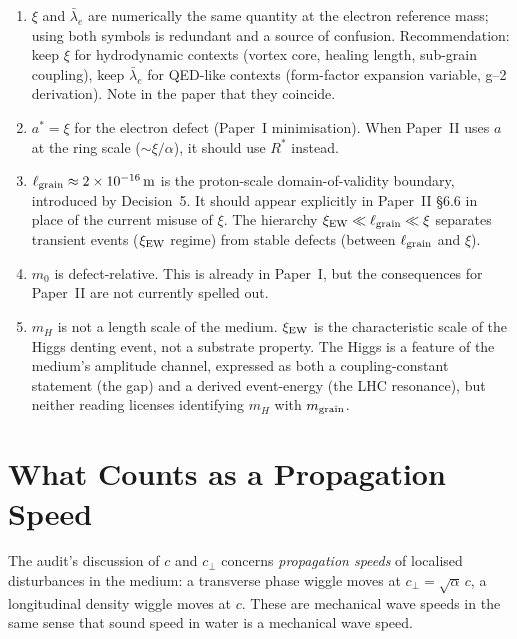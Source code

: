 \documentclass[11pt,a4paper]{article}
\begin{document}
\begin{enumerate}
\item $\xi$ and $\bar\lambda_e$ are numerically the same quantity at the
      electron reference mass; using both symbols is redundant and a source
      of confusion.  Recommendation: keep $\xi$ for hydrodynamic contexts
      (vortex core, healing length, sub-grain coupling), keep
      $\bar\lambda_e$ for QED-like contexts (form-factor expansion variable,
      g--2 derivation).  Note in the paper that they coincide.
\item $a^* = \xi$ for the electron defect (Paper~I minimisation).  When
      Paper~II uses $a$ at the ring scale ($\sim \xi/\alpha$), it should
      use $R^*$ instead.
\item $\ell_{\rm grain} \approx 2\times 10^{-16}\,\mathrm{m}$ is the
      proton-scale domain-of-validity boundary, introduced by Decision~5.
      It should appear explicitly in Paper~II \S6.6 in place of the
      current misuse of $\xi$.  The hierarchy
      $\xi_{\rm EW} \ll \ell_{\rm grain} \ll \xi$ separates transient
      events ($\xi_{\rm EW}$ regime) from stable defects (between
      $\ell_{\rm grain}$ and $\xi$).
\item $m_0$ is defect-relative.  This is already in Paper~I, but the
      consequences for Paper~II are not currently spelled out.
\item $m_H$ is not a length scale of the medium.  $\xi_{\rm EW}$ is the
      characteristic scale of the Higgs denting event, not a substrate
      property.  The Higgs is a feature of the medium's amplitude
      channel, expressed as both a coupling-constant statement (the gap)
      and a derived event-energy (the LHC resonance), but neither
      reading licenses identifying $m_H$ with $m_{\rm grain}$.
\end{enumerate}

\section{What Counts as a Propagation Speed}
\label{sec:propagation_scope}

The audit's discussion of $c$ and $c_\perp$ concerns \emph{propagation
speeds} of localised disturbances in the medium: a transverse phase
wiggle moves at $c_\perp = \sqrt\alpha\,c$, a longitudinal density
wiggle moves at $c$.  These are mechanical wave speeds in the same sense
that sound speed in water is a mechanical wave speed.
\end{document}
